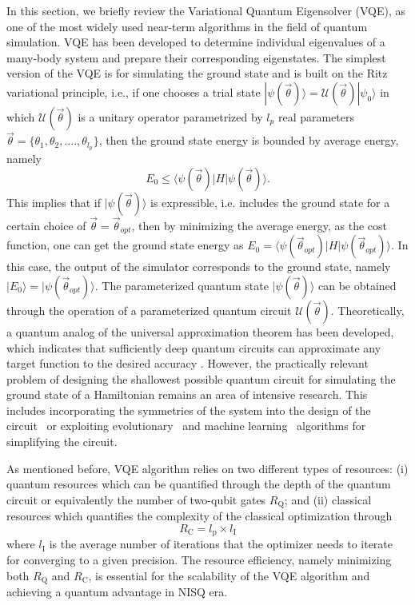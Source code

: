 \documentclass[aps, prx, reprint, superscriptaddress]{revtex4-2}
\begin{document}
In this section, we briefly review the Variational Quantum Eigensolver (VQE), as one of the most widely used near-term algorithms in the field of quantum simulation. VQE has been developed to determine individual eigenvalues of a many-body system and prepare their corresponding eigenstates.  The simplest version of the VQE is for simulating the ground state and is built on the Ritz variational principle, i.e., if one chooses a trial state $|\psi (\vec{\theta})\rangle {=} \mathcal{U}(\vec{\theta}) |\psi_0\rangle$ in which $\mathcal{U}(\vec{\theta})$ is a unitary operator parametrized by $l_p$ real parameters $\vec{\theta} {=} \lbrace \theta_1, \theta_2, ...., \theta_{l_p} \rbrace $, then the ground state energy is bounded by average energy, namely  
\begin{equation}
    E_0 \leq \langle \psi (\vec{\theta})|H|\psi (\vec{\theta})\rangle.
\end{equation}
This implies that if $|\psi (\vec{\theta})\rangle$ is expressible, i.e. includes the ground state for a certain choice of  $\vec{\theta}{=}\vec{\theta}_{opt}$, then by minimizing the average energy, as the cost function, one can get the ground state energy as $E_0{=}\langle \psi (\vec{\theta}_{opt})|H|\psi (\vec{\theta}_{opt})\rangle$. In this case, the output of the simulator corresponds to the ground state, namely $|E_0\rangle{=}|\psi (\vec{\theta}_{opt})\rangle$. The parameterized quantum state $|\psi (\vec{\theta})\rangle$ can be obtained through the operation of a parameterized quantum circuit $\mathcal{U}(\vec{\theta})$. Theoretically, a quantum analog of the universal approximation theorem has been developed, which indicates that sufficiently deep quantum circuits can approximate any target function to the desired accuracy \cite{wu2021expressivity}. However, the practically relevant problem of designing the shallowest possible quantum circuit for simulating the ground state of a Hamiltonian remains an area of intensive research. This includes incorporating the symmetries of the system into the design of the circuit~\cite{gard2020efficient, meyer2023exploiting,Lyu2023symmetry} or exploiting evolutionary~\cite{chivilikhin2020mog,huang2022robust} and machine learning~\cite{ostaszewski2021reinforcement,NEURIPS2021_97244127,PRXQuantum.2.010324} algorithms for simplifying the circuit. 

As mentioned before, VQE algorithm relies on two different types of resources: (i) quantum resources which can be quantified through the depth of the quantum circuit or equivalently the number of two-qubit gates $R_\text{Q}$; and (ii) classical resources which quantifies the complexity of the classical optimization through
\begin{equation}
    R_\text{C}=l_\text{p}\times  l_\text{I}
\end{equation}
where $l_\text{I}$ is the average number of iterations that the optimizer needs to iterate for converging to a given precision. The resource efficiency, namely minimizing both $R_{\text{Q}}$ and $R_\text{C}$, is essential for the scalability of the VQE algorithm and achieving a quantum advantage in NISQ era. 
\end{document}
